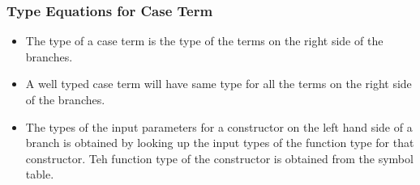 \documentclass[11pt]{article}
\begin{document}
\subsubsection {Type Equations for Case Term}
\begin{itemize}
  \item The type of a {\sf case} term is the type of the terms on the right side of the branches.
  \item A well typed case term will have same type for all the terms on the right side of the branches.
  \item The types of the input parameters for a constructor on the left hand side of a branch is obtained by looking up the input types of the function type for that constructor. Teh function type of the constructor is obtained from the symbol table. 
\end{itemize}
\end{document}
